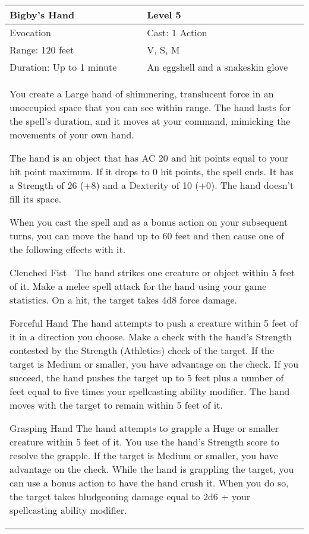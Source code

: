 \documentclass[11pt]{report}
\begin{document}
\begin{table}[H]
	\begin{tabular}{||p{6cm}|p{6cm}||}
		\hline\hline
		\bf{Bigby’s Hand} & Level 5\\ \hline
		Evocation & Cast: 1 Action\\ \hline
		Range: 120 feet & V, S, M \\ \hline
		Duration: Up to 1 minute & An eggshell and a snakeskin glove\\ \hline
		\multicolumn{2}{||p{12cm}||}{You create a Large hand of shimmering, translucent force in an unoccupied space that you can see within range. The hand lasts for the spell’s duration, and it moves at your command, mimicking the movements of your own hand. 

The hand is an object that has AC 20 and hit points equal to your hit point maximum. If it drops to 0 hit points, the spell ends. It has a Strength of 26 (+8) and a Dexterity of 10 (+0). The hand doesn’t fill its space. 

When you cast the spell and as a bonus action on your subsequent turns, you can move the hand up to 60 feet and then cause one of the following effects with it.

Clenched Fist 
The hand strikes one creature or object within 5 feet of it. Make a melee spell attack for the hand using your game statistics. On a hit, the target takes 4d8 force damage. 

Forceful Hand
The hand attempts to push a creature within 5 feet of it in a direction you choose. Make a check with the hand’s Strength contested by the Strength (Athletics) check of the target. If the target is Medium or smaller, you have advantage on the check. If you succeed, the hand pushes the target up to 5 feet plus a number of feet equal to five times your spellcasting ability modifier. The hand moves with the target to remain within 5 feet of it. 

Grasping Hand
The hand attempts to grapple a Huge or smaller creature within 5 feet of it. You use the hand’s Strength score to resolve the grapple. If the target is Medium or smaller, you have advantage on the check. While the hand is grappling the target, you can use a bonus action to have the hand crush it. When you do so, the target takes bludgeoning damage equal to 2d6 + your spellcasting ability modifier. 

}
\end{tabular}
\end{table}
\end{document}

